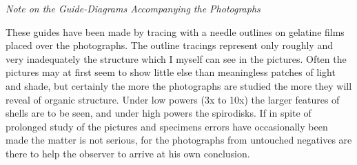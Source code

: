 \documentclass[a4paper, 12pt, oneside]{article}
\begin{document}
\bigskip
\centerline{\emph{Note on the Guide-Diagrams Accompanying the Photographs}}

These guides have been made by tracing with a needle outlines on gelatine films placed over the photographs. The outline tracings represent only roughly and very inadequately the structure which I myself can see in the pictures. Often the pictures may at first seem to show little else than meaningless patches of light and shade, but certainly the more the photographs are studied the more they will reveal of organic structure. Under low powers (3x to 10x) the larger features of shells are to be seen, and under high powers the spirodisks. If in spite of prolonged study of the pictures and specimens errors have occasionally been made the matter is not serious, for the photographs from untouched negatives are there to help the observer to arrive at his own conclusion.
\end{document}
